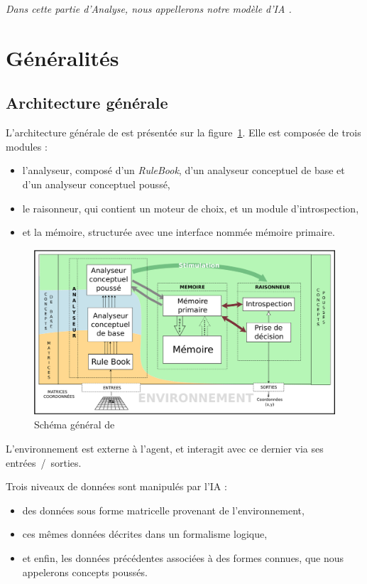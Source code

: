 \emph{Dans cette partie d'Analyse, nous appellerons notre modèle d'IA \cogito{}.}

\section{Généralités}

\subsection{Architecture générale}
\label{subsection_architecture_generale}
L'architecture générale de \cogito{} est présentée sur la figure~\ref{schema_general}. Elle est composée de trois modules :
\begin{itemize}
\item l'analyseur, composé d'un \emph{RuleBook}, d'un analyseur conceptuel de base et d'un analyseur conceptuel poussé,
\item le raisonneur, qui contient un moteur de choix, et un module d'introspection,
\item et la mémoire, structurée avec une interface nommée mémoire primaire.
\end{itemize}

\begin{figure}[H] 
\includegraphics[width=\textwidth]{files/simplified_general_diagram} 
\caption{Schéma général de \cogito{}} 
\label{schema_general}
\end{figure}

L'environnement est externe à l'agent, et interagit avec ce dernier via ses entrées~/~sorties.

Trois niveaux de données sont manipulés par l'IA :
\begin{itemize}
\item des données sous forme matricelle provenant de l'environnement,
\item ces mêmes données décrites dans un formalisme logique,
\item et enfin, les données précédentes associées à des formes connues, que nous appelerons concepts poussés.
\end{itemize}

